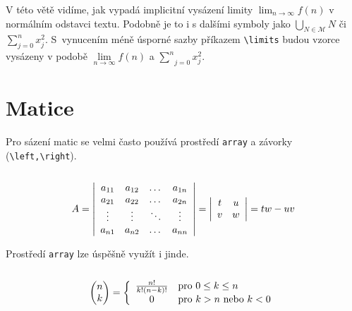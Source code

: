 \documentclass[11pt,twocolumn,a4paper]{article}
\begin{document}
V této větě vidíme, jak vypadá implicitní vysázení li\-mity $\lim_{n \rightarrow \infty} f(n)$ v normálním odstavci textu. Podobně je to i s dalšími symboly jako $\bigcup_{N \in \mathcal{M}}N$ či $\sum^n_{j=0}x^2_j$.
S~vy\-nucením méně úsporné sazby příkazem \verb|\limits| budou vzorce vysázeny v podobě $\underset{n \rightarrow \infty}{\lim} f(n)$ a $\underset{j=0}{\overset{n}{\sum}} x^2_j $.


\section{Matice}

Pro sázení matic se velmi často používá prostředí \texttt{array} a závorky (\verb|\left,\right|). \\ \\
\[ 
A = 
\left |
\begin{array}{cccc}
     a_{11}&  a_{12} & \dots & a_{1n} \\
     a_{21}& a_{22} & \dots & a_{2n} \\
     \vdots & \vdots & \ddots & \vdots\\
     a_{n1} & a_{n2} & \dots & a_{nn}
\end{array} \right | = \left | \begin{array}{cc}
t & u \\
v & w \\
\end{array} \right | = tw - uv \\ \vspace{0.2cm}
\]

\hspace{-0.1cm}Prostředí \texttt{array} lze úspěšně využít i jinde. \\ \\
\[ 
\begin{pmatrix}
n \\
k
\end{pmatrix} = 
\left \{ \begin{array}{ll}
\frac{n!}{k!(n-k)!} & \mbox{pro $0 \leq k \leq n$}\\
\hfill 0 \hfill & \mbox{pro $k > n$ nebo $k < 0$}\end{array} \right. 
\]
\end{document}
